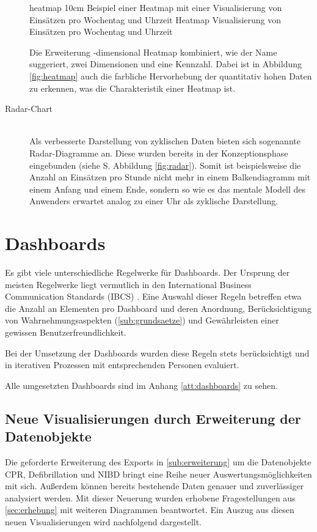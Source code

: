 \begin{description}
\bild
{heatmap}
{10cm}
{Beispiel einer Heatmap mit einer Visualisierung von Einsätzen pro Wochentag und Uhrzeit}
{Heatmap Visualisierung von Einsätzen pro Wochentag und Uhrzeit}

Die Erweiterung -dimensional Heatmap\grqq{} kombiniert, wie der Name suggeriert, zwei Dimensionen und eine Kennzahl.
Dabei ist in Abbildung \ref{fig:heatmap} auch die farbliche Hervorhebung der quantitativ hohen Daten zu erkennen, was die Charakteristik einer Heatmap ist.

\item[Radar-Chart] \hfill \\
Als verbesserte Darstellung von zyklischen Daten bieten sich sogenannte Radar-Diagramme an.
Diese wurden bereits in der Konzeptionsphase eingebunden (siehe S. \pageref{fig:radar} Abbildung \ref{fig:radar}).
Somit ist beispielsweise die Anzahl an Einsätzen pro Stunde nicht mehr in einem Balkendiagramm mit einem Anfang und einem Ende, sondern so wie es das mentale Modell des Anwenders erwartet analog zu einer Uhr als zyklische Darstellung.
\end{description}


\section{Dashboards}
\label{sec:dashboard} %
Es gibt viele unterschiedliche Regelwerke für Dashboards.
Der Ursprung der meisten Regelwerke liegt vermutlich in den \glqq International Business Communication Standards (IBCS)\grqq{} \cite{Hichert.2017}.
Eine Auswahl dieser Regeln betreffen etwa die Anzahl an Elementen pro Dashboard und deren Anordnung, Berücksichtigung von Wahrnehmungsaspekten (\ref{sub:grundsaetze}) und Gewährleisten einer gewissen Benutzerfreundlichkeit.

Bei der Umsetzung der Dashboards wurden diese Regeln stets berücksichtigt und in iterativen Prozessen mit entsprechenden Personen evaluiert.




Alle umgesetzten Dashboards sind im Anhang \ref{att:dashboards} zu sehen.

\subsection{Neue Visualisierungen durch Erweiterung der Datenobjekte}
Die geforderte Erweiterung des Exports in \ref{sub:erweiterung} um die Datenobjekte \gls{CPR}, Defibrillation und \gls{NIBD} bringt eine Reihe neuer Auswertungsmöglichkeiten mit sich.
Außerdem können bereits bestehende Daten genauer und zuverlässiger analysiert werden.
Mit dieser Neuerung wurden erhobene Fragestellungen aus \ref{sec:erhebung} mit weiteren Diagrammen beantwortet.
Ein Auszug aus diesen neuen Visualisierungen wird nachfolgend dargestellt.

